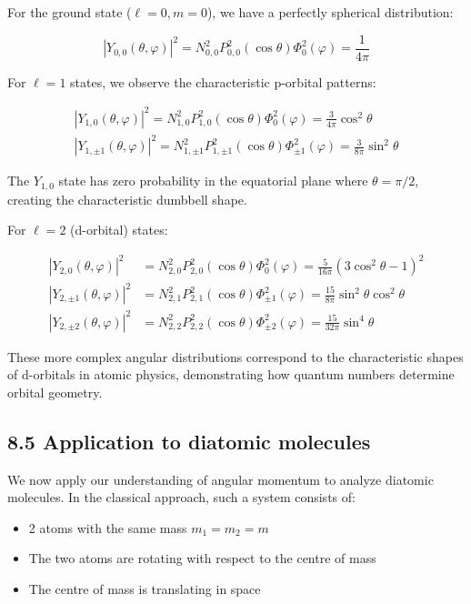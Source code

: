 \documentclass[italian]{HKNdocument}
\begin{document}
For the ground state ($\ell=0, m=0$), we have a perfectly spherical distribution:

\begin{equation*}
\left|Y_{0,0}(\theta, \varphi)\right|^{2}=N_{0,0}^{2} P_{0,0}^{2}(\cos \theta) \Phi_{0}^{2}(\varphi)=\frac{1}{4 \pi} \tag{8.60}
\end{equation*}

For $\ell=1$ states, we observe the characteristic p-orbital patterns:

\[
\begin{array}{r}
\left|Y_{1,0}(\theta, \varphi)\right|^{2}=N_{1,0}^{2} P_{1,0}^{2}(\cos \theta) \Phi_{0}^{2}(\varphi)=\frac{3}{4 \pi} \cos ^{2} \theta \\
\left|Y_{1, \pm 1}(\theta, \varphi)\right|^{2}=N_{1, \pm 1}^{2} P_{1, \pm 1}^{2}(\cos \theta) \Phi_{ \pm 1}^{2}(\varphi)=\frac{3}{8 \pi} \sin ^{2} \theta \tag{8.61}
\end{array}
\]

The $Y_{1,0}$ state has zero probability in the equatorial plane where $\theta=\pi/2$, creating the characteristic dumbbell shape.

For $\ell=2$ (d-orbital) states:

\begin{align*}
\left|Y_{2,0}(\theta, \varphi)\right|^{2} & =N_{2,0}^{2} P_{2,0}^{2}(\cos \theta) \Phi_{0}^{2}(\varphi)=\frac{5}{16 \pi}\left(3 \cos ^{2} \theta-1\right)^{2} \\
\left|Y_{2, \pm 1}(\theta, \varphi)\right|^{2} & =N_{2,1}^{2} P_{2,1}^{2}(\cos \theta) \Phi_{ \pm 1}^{2}(\varphi)=\frac{15}{8 \pi} \sin ^{2} \theta \cos ^{2} \theta  \tag{8.62}\\
\left|Y_{2, \pm 2}(\theta, \varphi)\right|^{2} & =N_{2,2}^{2} P_{2,2}^{2}(\cos \theta) \Phi_{ \pm 2}^{2}(\varphi)=\frac{15}{32 \pi} \sin ^{4} \theta
\end{align*}

These more complex angular distributions correspond to the characteristic shapes of d-orbitals in atomic physics, demonstrating how quantum numbers determine orbital geometry.

\subsection*{8.5 Application to diatomic molecules}
We now apply our understanding of angular momentum to analyze diatomic molecules. In the classical approach, such a system consists of:

\begin{itemize}
  \item 2 atoms with the same mass $m_{1}=m_{2}=m$
  \item The two atoms are rotating with respect to the centre of mass
  \item The centre of mass is translating in space
\end{itemize}
\end{document}
